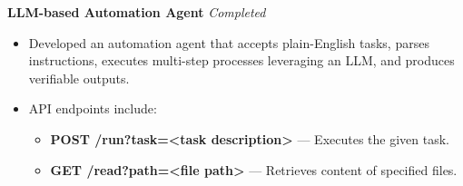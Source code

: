 \documentclass[a4paper,10pt]{article}
\begin{document}
\textbf{LLM-based Automation Agent} \hfill \textit{Completed} \\
\begin{itemize}[left=0.15in]
    \item Developed an automation agent that accepts plain-English tasks, parses instructions, executes multi-step processes leveraging an LLM, and produces verifiable outputs.
    \item API endpoints include:
    \begin{itemize}
        \item \textbf{POST /run?task=<task description>} — Executes the given task.
        \item \textbf{GET /read?path=<file path>} — Retrieves content of specified files.
    \end{itemize}
\end{itemize}
\end{document}
